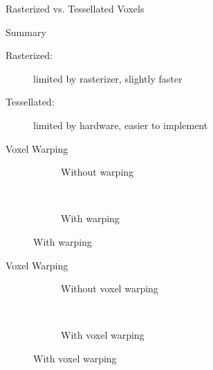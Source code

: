 \documentclass[10pt]{beamer}
\begin{document}
\begin{frame}{Rasterized vs. Tessellated Voxels}
  \begin{block}{Summary}
    \begin{description}
      \item[Rasterized:] limited by rasterizer, slightly faster
      \item[Tessellated:] limited by hardware, easier to implement
    \end{description}
  \end{block}
\end{frame}

\begin{frame}{Voxel Warping}
  \begin{figure}
    \begin{subfigure}[t]{0.475\textwidth}
      \caption*{Without warping}
    \end{subfigure}
    ~
    \begin{subfigure}[t]{0.475\textwidth}
      \caption*{With warping}
    \end{subfigure}
  \end{figure}
\end{frame}

\begin{frame}{Voxel Warping}
  \begin{figure}
    \begin{subfigure}[t]{0.475\textwidth}
      \caption*{Without voxel warping}
    \end{subfigure}
    ~
    \begin{subfigure}[t]{0.475\textwidth}
      \caption*{With voxel warping}
    \end{subfigure}
  \end{figure}
\end{frame}
\end{document}
